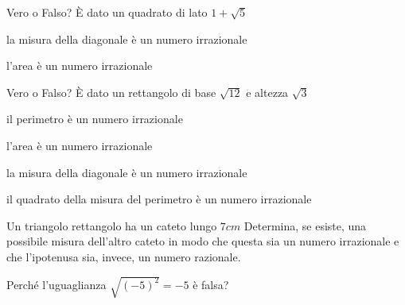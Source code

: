 \begin{esercizio}%
Vero o Falso? È dato un quadrato di lato \(1+\sqrt 5\)
\vspace{-1mm}
\TabPositions{11.5cm}
 \begin{enumeratea}
 \item la misura della diagonale è un numero irrazionale \tab\boxV\quad\boxF
 \item l'area è un numero irrazionale \tab\boxV\quad\boxF
 \end{enumeratea}
\end{esercizio}

\begin{esercizio}%
Vero o Falso? È dato un rettangolo di base \(\sqrt{12}\) e altezza \(\sqrt 3\)
\vspace{-1mm}
\TabPositions{11.5cm}
 \begin{enumeratea}
 \item il perimetro è un numero irrazionale \tab\boxV\quad\boxF
 \item l'area è un numero irrazionale \tab\boxV\quad\boxF
 \item la misura della diagonale è un numero irrazionale \tab\boxV\quad\boxF
 \item il quadrato della misura del perimetro è un numero 
  irrazionale \tab\boxV\quad\boxF
 \end{enumeratea}
\end{esercizio}

\begin{esercizio}%
Un triangolo rettangolo ha un cateto lungo \(7\unit{cm}\) Determina, se esiste, 
una possibile misura dell'altro cateto in modo che questa sia un numero irrazionale e che l'ipotenusa sia, invece, un numero razionale.
\end{esercizio}

\begin{esercizio}%
Perché l'uguaglianza \(\sqrt{(-5)^2}=-5\) è falsa?
\end{esercizio}

